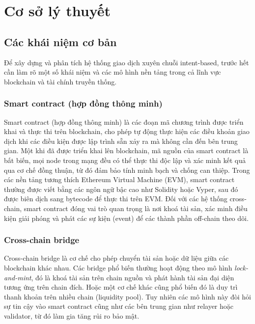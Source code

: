 \chapter{Cơ sở lý thuyết}
\label{chap:background}

\section{Các khái niệm cơ bản}

Để xây dựng và phân tích hệ thống giao dịch xuyên chuỗi intent-based,
trước hết cần làm rõ một số khái niệm và các mô hình nền tảng trong cả lĩnh vực blockchain
và tài chính truyền thống.

\subsection*{Smart contract (hợp đồng thông minh)}

Smart contract (hợp đồng thông minh) là các đoạn mã chương trình được triển khai
và thực thi trên blockchain, cho phép tự động thực hiện các điều khoản giao dịch
khi các điều kiện được lập trình sẵn xảy ra mà không cần đến bên trung gian.
Một khi đã được triển khai lên blockchain, mã nguồn của smart contract là bất biến,
mọi node trong mạng đều có thể thực thi độc lập và xác minh kết quả qua cơ chế đồng
thuận, từ đó đảm bảo tính minh bạch và chống can thiệp.
Trong các nền tảng tương thích Ethereum Virtual Machine (EVM), smart contract
thường được viết bằng các ngôn ngữ bậc cao như Solidity hoặc Vyper, sau đó được biên
dịch sang bytecode để thực thi trên EVM.
Đối với các hệ thống cross-chain, smart contract đóng vai trò quan trọng là nơi khoá
tài sản, xác minh điều kiện giải phóng và phát các sự kiện (event) để các thành phần
off-chain theo dõi.

\subsection*{Cross-chain bridge}

Cross-chain bridge là cơ chế cho phép chuyển tài sản hoặc dữ liệu giữa các blockchain khác nhau. 
Các bridge phổ biến thường hoạt động theo mô hình \textit{lock-and-mint}, 
đó là khoá tài sản trên chain nguồn và phát hành tài sản đại diện tương ứng trên chain đích.
Hoặc một cơ chế khác cũng phổ biến đó là duy trì thanh khoản trên
nhiều chain (liquidity pool).
Tuy nhiên các mô hình này đòi hỏi sự tin cậy vào smart contract 
cũng như các bên trung gian như relayer hoặc validator, từ đó làm gia tăng rủi ro bảo mật.

